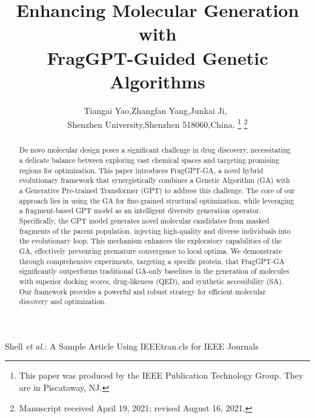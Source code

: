 \documentclass[letterpaper,journal]{IEEEtran}
\begin{document}
\title{Enhancing Molecular Generation with\\FragGPT-Guided Genetic Algorithms}

\author{Tiangai Yao,Zhangfan Yang,Junkai Ji,~\\Shenzhen University,Shenzhen 518060,China.
\thanks{This paper was produced by the IEEE Publication Technology Group. They are in Piscataway, NJ.}%
\thanks{Manuscript received April 19, 2021; revised August 16, 2021.}}
%
{Shell \MakeLowercase{\textit{et al.}}: A Sample Article Using IEEEtran.cls for IEEE Journals}


\maketitle
\begin{abstract}
De novo molecular design poses a significant challenge in drug discovery, necessitating a delicate balance between exploring vast chemical spaces and targeting promising regions for optimization. This paper introduces FragGPT-GA, a novel hybrid evolutionary framework that synergistically combines a Genetic Algorithm (GA) with a Generative Pre-trained Transformer (GPT) to address this challenge. The core of our approach lies in using the GA for fine-grained structural optimization, while leveraging a fragment-based GPT model as an intelligent diversity generation operator. Specifically, the GPT model generates novel molecular candidates from masked fragments of the parent population, injecting high-quality and diverse individuals into the evolutionary loop. This mechanism enhances the exploratory capabilities of the GA, effectively preventing premature convergence to local optima. We demonstrate through comprehensive experiments, targeting a specific protein, that FragGPT-GA significantly outperforms traditional GA-only baselines in the generation of molecules with superior docking scores, drug-likeness (QED), and synthetic accessibility (SA). Our framework provides a powerful and robust strategy for efficient molecular discovery and optimization. 
\end{abstract}
\end{document}
